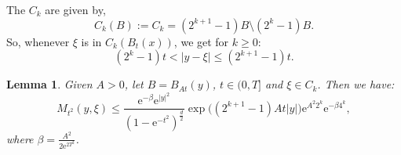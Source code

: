\documentclass[a4paper,oneside,10pt]{amsproc}
\theoremstyle{plain}
\newtheorem{lemma}{Lemma}
\theoremstyle{remark}
\theoremstyle{definition}
\renewcommand{\leq}{\leqslant}
\renewcommand{\leq}{\leqslant}
\renewcommand{\geq}{\geqslant}
\newcommand{\e}{\mathrm{e}} %
\renewcommand{\leq}{\leqslant}%
\renewcommand{\geq}{\geqslant}%
\begin{document}
The $C_k$ are given by,
\begin{equation}
  \label{eq:C_k-annulus-decomposition}
  C_k(B) := C_k = (2^{k + 1} - 1)B \setminus (2^k - 1)B.
\end{equation}
So, whenever $\xi$ is in $C_k(B_t(x))$, we get for $k \geq 0$:
\begin{equation}
  \label{eq:C_k-annulus-decomposition-expand}
  (2^k - 1) t < |y - \xi| \leq (2^{k + 1} - 1) t.
\end{equation}

\begin{lemma}\label{lem:On-diagonal-kernel-estimates-on-Ck}
  Given $A > 0$, let $B = B_{At}(y)$, $t \in (0, T]$ and $\xi \in C_k$. Then we have:
  \begin{equation*}
    M_{t^2}(y, \xi) \leq \frac{\e^{-\beta} \e^{|y|^2}}{(1 - \e^{-t^2})^{\frac{d}2}}
    \exp\bigl((2^{k + 1} - 1) A t |y| \bigr) \e^{A^2 2^k} \e^{-\beta 4^k},
  \end{equation*}
  where $\beta = \frac{A^2}{2 \e^{2T^2}}$.
\end{lemma}
\end{document}
